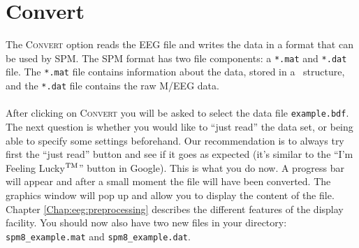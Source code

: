 \section{Convert}
The \textsc{Convert} option reads the EEG file and writes the data in a format that can be used by SPM. The SPM format has two file components: a \texttt{*.mat} and \texttt{*.dat} file. The \texttt{*.mat} file contains information about the data, stored in a \matlab\ structure, and the \texttt{*.dat} file contains the raw M/EEG data.
\\
\\
After clicking on \textsc{Convert} you will be asked to select the data file \texttt{example.bdf}. The next question is whether you would like to ``just read'' the data set, or being able to specify some settings beforehand. Our recommendation is to always try first the ``just read'' button and see if it goes as expected (it's similar to the ``I'm Feeling Lucky\leavevmode\hbox{$\rm {}^{TM}$}'' button in Google). This is what you do now. A progress bar will appear and after a small moment the file will have been converted. The graphics window will pop up and allow you to display the content of the file. Chapter \ref{Chap:eeg:preprocessing} describes the different features of the display facility. You should now also have two new files in your directory: \texttt{spm8\_example.mat} and \texttt{spm8\_example.dat}.

